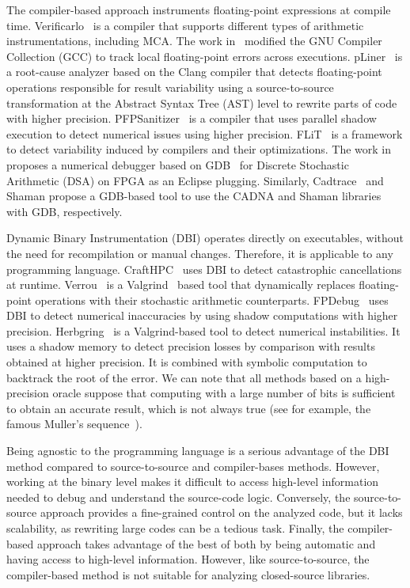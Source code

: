 \documentclass[11pt]{article}
\newcommand{\tristan}[1]{\color{orange}\textbf{From Tristan:} #1\color{black}\xspace}
\begin{document}
The compiler-based approach instruments floating-point expressions at compile time. 
Verificarlo~\cite{verificarlo} is a compiler that supports different types of arithmetic instrumentations, including MCA. 
The work in~\cite{bao2013fly} modified the GNU Compiler Collection (GCC) to track local floating-point errors across executions. pLiner~\cite{guo2020pliner} is a root-cause analyzer based on the Clang compiler that detects floating-point operations responsible for result variability using a source-to-source transformation at the Abstract Syntax Tree (AST) level to rewrite parts of code with higher precision. 
PFPSanitizer~\cite{chowdhary2020debugging,chowdhary2021parallel} is a compiler that uses parallel shadow execution to detect numerical issues using higher precision.
FLiT~\cite{sawaya2017flit} is a framework to detect variability induced by compilers and their optimizations.
The work in~\cite{wang2012development} proposes a numerical debugger based on GDB~\cite{stallman1988debugging} for Discrete Stochastic Arithmetic (DSA) on FPGA as an Eclipse plugging. Similarly, Cadtrace~\cite{jezequel2008cadna} and Shaman propose a GDB-based tool to use the CADNA and Shaman libraries with GDB, respectively.

Dynamic Binary Instrumentation (DBI) operates directly on executables, without the need for recompilation or manual changes. Therefore, it is applicable to any programming language.
CraftHPC~\cite{lam2013dynamic} uses DBI to detect catastrophic cancellations at runtime.
Verrou~\cite{fevotte2016verrou} is a Valgrind~\cite{nethercote2007valgrind} based tool that dynamically replaces
floating-point operations with their stochastic arithmetic counterparts. FPDebug~\cite{benz2012dynamic} uses DBI to detect numerical inaccuracies by using shadow computations with higher precision.
Herbgring~\cite{sanchez2017finding} is a Valgrind-based tool to detect
numerical instabilities. It uses a shadow memory to detect precision losses by comparison with results obtained at higher precision. It is combined with symbolic computation to backtrack the root of the error.
We can note that all methods based on a high-precision oracle suppose that computing with a large number of bits is sufficient to obtain an accurate result, which is not always true (see for example, the famous Muller's sequence~\cite{bajard1996introduction}). %

Being agnostic to the programming language is a serious advantage of the DBI method compared to source-to-source and compiler-bases methods. However, working at the binary level makes it difficult to access high-level information needed to debug and understand the source-code logic. Conversely, the source-to-source approach provides a fine-grained control on the analyzed code, but it lacks scalability, as rewriting large codes can be a tedious task. Finally, the compiler-based approach takes advantage of the best of both by being automatic and having access to high-level information. However, like source-to-source, the compiler-based method is not suitable for analyzing closed-source libraries.
\end{document}
